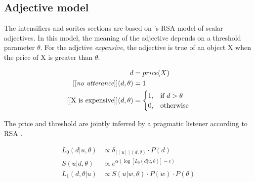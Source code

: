 \documentclass{article}
\newcommand{\w}[1]{\emph{#1}}
\newcommand{\s}[1]{``#1''}
\begin{document}
   \begin{appendices}

      \section{Adjective model \label{sec:adj_model}}

   The intensifiers and sorites sections are based on 's RSA model of scalar adjectives.
   In this model, the meaning of the adjective depends on a threshold parameter $\theta$.
   For the adjctive \w{expensive}, the adjective is true of an object X when the price of X is greater than $\theta$.

   \begin{align*}
      d &= price(X) \\
      [[\text{\w{no utterance}}]](d, \theta) &= 1 \\
      [[\text{X is expensive}]](d, \theta) &= \begin{cases}
          1, & \text{if } d>\theta \\
          0, & \text{otherwise}
      \end{cases} \\
   \end{align*}


   The price and threshold are jointly inferred by a pragmatic listener according to RSA \cite{GoodmanFrank2016-TICS}.


   \begin{align*}
      L_0(d|u, \theta) &\propto \delta_{[[u]](d, \theta)} \cdot P(d) \\
      S(u | d, \theta) &\propto e^{
         \alpha \left( \log[L_0(d|u, \theta)] - c \right)
      } \\
      L_1(d, \theta | u) &\propto S(u|w, \theta) \cdot P(w) \cdot P(\theta)
   \end{align*}




\end{appendices}
\end{document}
